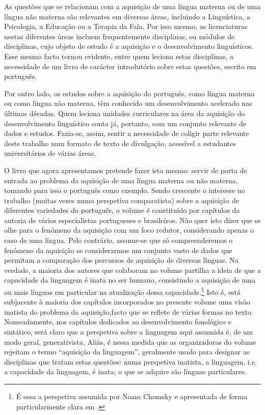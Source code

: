 
As questões que se relacionam com a aquisição de uma língua materna ou de uma língua não materna são relevantes em diversas áreas, incluindo a Linguística, a Psicologia, a Educação ou a Terapia da Fala. Por isso mesmo, as licenciaturas nestas diferentes áreas incluem frequentemente disciplinas, ou módulos de disciplinas, cujo objeto de estudo é a aquisição e o desenvolvimento linguísticos. Esse mesmo facto tornou evidente, entre quem leciona estas disciplinas, a necessidade de um livro de carácter introdutório sobre estas questões, escrito em português.

Por outro lado, os estudos sobre a aquisição do português, como língua materna ou como língua não materna, têm conhecido um desenvolvimento acelerado nas últimas décadas. Quem leciona unidades curriculares na área da aquisição do desenvolvimento linguístico conta já, portanto, com um conjunto relevante de dados e estudos. Fazia-se, assim, sentir a necessidade de coligir parte relevante deste trabalho num formato de texto de divulgação, acessível a estudantes universitários de várias áreas. 

O livro que agora apresentamos pretende fazer isto mesmo: servir de porta de entrada ao problema da aquisição de uma língua materna ou não materna, tomando para isso o português como exemplo. Sendo crescente o interesse no trabalho (muitas vezes numa perspetiva comparatista) sobre a aquisição de diferentes variedades do português, o volume é constituído por capítulos da autoria de vários especialistas portugueses e brasileiros. Não quer isto dizer que se olhe para o fenómeno da aquisição com um foco redutor, considerando apenas o caso de uma língua. Pelo contrário, assume-se que só compreenderemos o fenómeno da aquisição se considerarmos um conjunto vasto de dados que permitam a comparação dos percursos de aquisição de diversas línguas. Na verdade, a maioria dos autores que colaboram no volume partilha a ideia de que a capacidade da linguagem é inata no ser humano, consistindo a aquisição de uma ou mais línguas em particular na atualização dessa capacidade.\footnote{É essa a perspetiva assumida por Noam Chomsky e apresentada de forma particularmente clara em \citet{chomsky1986}.} Isto é, está subjacente à maioria dos capítulos incorporados no presente volume uma visão inatista do problema da aquisição,\largerpage facto que se reflete de várias formas no texto. Nomeadamente, nos capítulos dedicados ao desenvolvimento fonológico e sintático, será claro que a  perspetiva sobre a linguagem aqui assumida é, de um modo geral, generativista. Aliás, é nessa medida que as organizadoras do volume rejeitam o termo ``aquisição da linguagem'', geralmente usado para designar as disciplinas que tratam estas questões: numa perspetiva inatista, a linguagem, i.e. a capacidade da linguagem, é inata; o que se adquire são línguas particulares.

